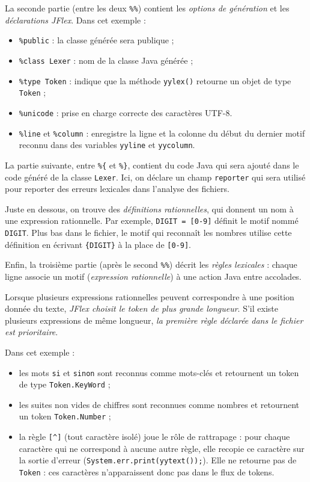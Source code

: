 \documentclass[correction]{td}
\begin{document}
\begin{exercice}
  La seconde partie (entre les deux \lstinline|%%|)
  contient les \emph{options de génération} et les \emph{déclarations JFlex}.
  Dans cet exemple :
  \begin{itemize}
  \item \texttt{\%public} :
    la classe générée sera publique ;
  \item \texttt{\%class Lexer} :
    nom de la classe Java générée ;
  \item \texttt{\%type Token} :
    indique que la méthode \lstinline|yylex()| retourne un objet de type \texttt{Token} ;
  \item \texttt{\%unicode} :
    prise en charge correcte des caractères UTF-8.
  \item \texttt{\%line} et \texttt{\%column} :
    enregistre la ligne et la colonne du début du dernier motif reconnu dans des variables \texttt{yyline} et \texttt{yycolumn}.
  \end{itemize}

  La partie suivante, entre \texttt{\%\{} et \texttt{\%\}}, contient du code Java qui sera
  ajouté dans le code généré de la classe \texttt{Lexer}. Ici, on déclare un champ \texttt{reporter}
  qui sera utilisé pour reporter des erreurs lexicales dans l'analyse des fichiers.
  
  Juste en dessous, on trouve des \emph{définitions rationnelles}, qui donnent un nom
  à une expression rationnelle. Par exemple,
  \lstinline|DIGIT = [0-9]|
  définit le motif nommé \lstinline|DIGIT|. Plus bas dans le fichier,
  le motif qui reconnaît les nombres utilise cette définition en écrivant
  \lstinline|{DIGIT}| à la place de \lstinline|[0-9]|.

  Enfin, la troisième partie (après le second \lstinline|%%|)
  décrit les \emph{règles lexicales} : chaque ligne associe un motif
  (\emph{expression rationnelle}) à une action Java entre accolades.

  Lorsque plusieurs expressions rationnelles peuvent correspondre
  à une position donnée du texte, \emph{JFlex choisit le token de plus grande longueur}.
  S'il existe plusieurs expressions de même longueur,
  \emph{la première règle déclarée dans le fichier est prioritaire}.

  Dans cet exemple :
  \begin{itemize}
  \item les mots \texttt{si} et \texttt{sinon} sont reconnus comme mots-clés
    et retournent un token de type \texttt{Token.KeyWord} ;
  \item les suites non vides de chiffres sont reconnues comme nombres
    et retournent un token \texttt{Token.Number} ;
  \item la règle \lstinline|[^]| (tout caractère isolé) joue le rôle de \og rattrapage \fg :
    pour chaque caractère qui ne correspond à aucune autre règle, elle recopie ce caractère
    sur la sortie d'erreur (\texttt{System.err.print(yytext());}).
    Elle ne retourne pas de \texttt{Token} : ces caractères n'apparaissent donc pas
    dans le flux de tokens.
  \end{itemize}
  

\end{exercice}
\end{document}

